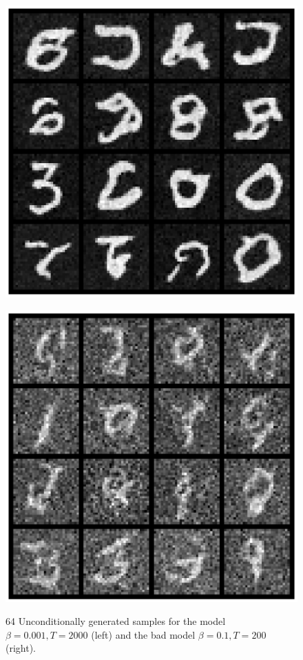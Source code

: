 \documentclass[11pt]{article}
\begin{document}
    \begin{figure}[H]
        \centering
        \begin{minipage}{0.48\textwidth}
            \includegraphics[width=\linewidth]{figs/q1c_good_uncond_samples.png}
            \label{fig:left_img_2}
        \end{minipage}\hfill
        \begin{minipage}{0.48\textwidth}
            \includegraphics[width=\linewidth]{figs/q1c_bad_uncond_samples.png}
            \label{fig:right_img_2}
        \end{minipage}
        \caption{64 Unconditionally generated samples for the model $\beta = 0.001, T=2000$ (left) and the bad model  $\beta = 0.1, T=200$ (right).}
        \label{fig:q1c_unconditional_samples}
    \end{figure}
\end{document}
